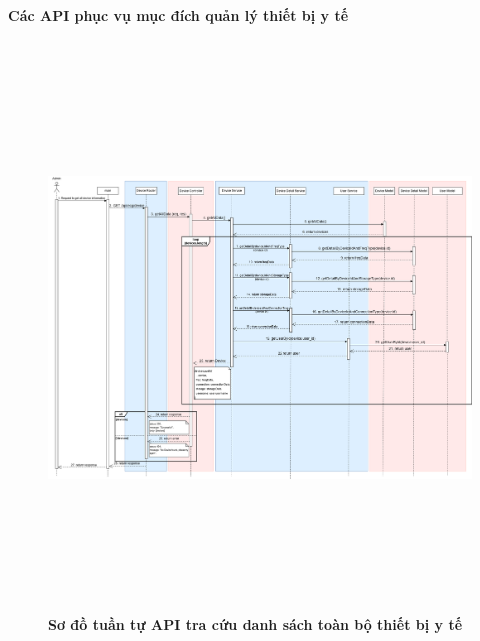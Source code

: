 \paragraph{Các API phục vụ mục đích quản lý thiết bị y tế}
\mbox{}
\begin{figure}[H]
	\centering
	\includegraphics[width=15cm,height=15cm]{Images/api_sequence/device/device-GetAllDevice.drawio.png}
	\caption[Sơ đồ tuần tự API tra cứu danh sách thiết bị y tế]{\bfseries \fontsize{12pt}{0pt}\selectfont Sơ đồ tuần tự API tra cứu danh sách toàn bộ thiết bị y tế}
	\label{sequence_diagram_get_all_devices}
\end{figure}


